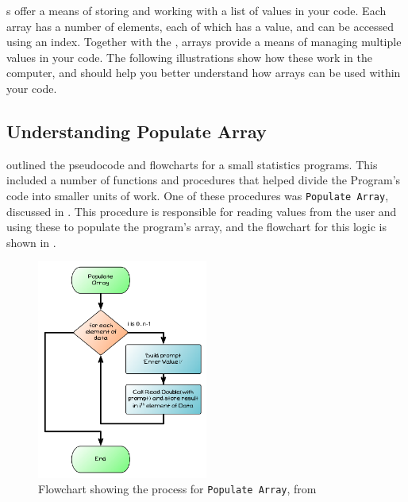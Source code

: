s offer a means of storing and working with a list of values in your code. Each array has a number of elements, each of which has a value, and can be accessed using an index. Together with the , arrays provide a means of managing multiple values in your code. The following illustrations show how these work in the computer, and should help you better understand how arrays can be used within your code.

\subsection{Understanding Populate Array} %
\label{sub:understanding_populate_array}

  outlined the pseudocode and flowcharts for a small statistics programs. This included a number of functions and procedures that helped divide the Program's code into smaller units of work. One of these procedures was \texttt{Populate Array}, discussed in  . This procedure is responsible for reading values from the user and using these to populate the program's array, and the flowchart for this logic is shown in .

\begin{figure}[htbp]
   \centering
   \includegraphics[width=0.5\textwidth]{./topics/arrays/diagrams/PopulateArray} 
   \caption{Flowchart showing the process for \texttt{Populate Array}, from }
   \label{fig:populate-array-flow-understanding}
\end{figure}

